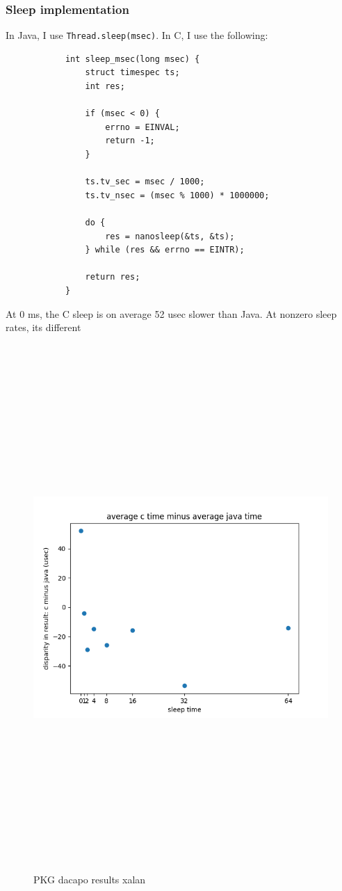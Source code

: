 \documentclass{article}
\begin{document}
    \subsubsection{Sleep implementation}
        In Java, I use \texttt{Thread.sleep(msec)}. In C, I use the following:
        \begin{verbatim}
            int sleep_msec(long msec) {
	            struct timespec ts;
	            int res;

            	if (msec < 0) {
	            	errno = EINVAL;
            		return -1;
            	}

            	ts.tv_sec = msec / 1000;
	            ts.tv_nsec = (msec % 1000) * 1000000;

            	do {
	            	res = nanosleep(&ts, &ts);
	            } while (res && errno == EINTR);
	            
	            return res;
            }
        \end{verbatim}
At 0 ms, the C sleep is on average 52 usec slower than Java. At nonzero sleep rates, its different
    \begin{figure}[H]
    	\centering
    	\includegraphics[width=17cm,height=20cm,keepaspectratio]{AsyncMonitorCompares/sleep-timer_java-vs-c/c-java-avg-difference.png}
    	\caption{PKG dacapo results xalan}
    	\label{fig:xalan-fix-PKG}
    \end{figure}
\end{document}
